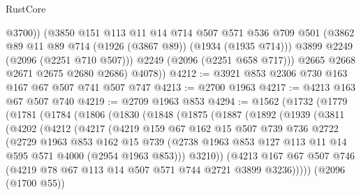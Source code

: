 \begin{lexlean}{RustCore}
\begin{coremodule}
                @3700))
            (@3850
              @151
              @113
              @11
              @14
              @714
              @507
              @571
              @536
              @709
              @501
              (@3862 @89 @11 @89 @714 (@1926 (@3867 @89)) (@1934 (@1935 @714)))
              @3899
              @2249
              (@2096 (@2251 @710 @507)))
            @2249
            (@2096 (@2251 @658 @717)))
          @2665
          @2668
          @2671
          @2675
          @2680
          @2686)
        @4078))
@4212 := @3921 @853 @2306 @730 @163 @167 @67 @507 @741 @507 @747
@4213 := @2700 @1963
@4217 := @4213 @163 @67 @507 @740
@4219 := @2709 @1963 @853
@4294 := @1562
    (@1732
      (@1779
        (@1781
          (@1784
            (@1806
              (@1830
                (@1848
                  (@1875
                    (@1887
                      (@1892
                        (@1939
                          (@3811
                            (@4202
                              (@4212
                                (@4217
                                  (@4219
                                    @159
                                    @67
                                    @162
                                    @15
                                    @507
                                    @739
                                    @736
                                    @2722
                                    (@2729
                                      @1963
                                      @853
                                      @162
                                      @15
                                      @739
                                      (@2738
                                        @1963
                                        @853
                                        @127
                                        @113
                                        @11
                                        @14
                                        @595
                                        @571
                                        @4000
                                        (@2954 @1963 @853)))
                                    @3210))
                                (@4213
                                  @167
                                  @67
                                  @507
                                  @746
                                  (@4219 @78 @67 @113 @14 @507 @571 @744 @2721 @3899 @3236)))))
                          (@2096 (@1700 @55))

\end{coremodule}
\end{lexlean}
